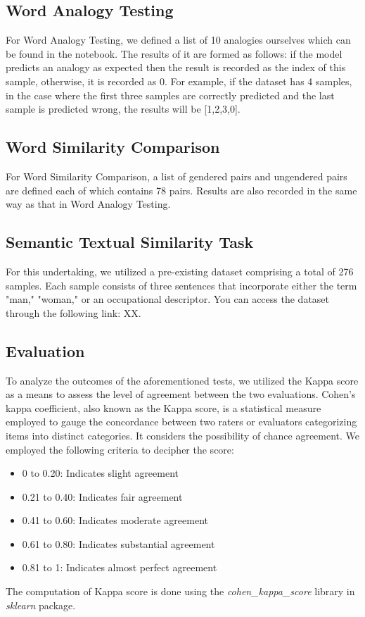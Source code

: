 \documentclass[11pt]{article}
\begin{document}
\subsection{Word Analogy Testing}
For Word Analogy Testing, we defined a list of 10 analogies ourselves which can be found in the notebook. The results of it are formed as follows: if the model predicts an analogy as expected then the result is recorded as the index of this sample, otherwise, it is recorded as 0. For example, if the dataset has 4 samples, in the case where the first three samples are correctly predicted and the last sample is predicted wrong, the results will be [1,2,3,0].\\

\subsection{Word Similarity Comparison}
For Word Similarity Comparison, a list of gendered pairs and ungendered pairs are defined each of which contains 78 pairs. Results are also recorded in the same way as that in Word Analogy Testing. 

\subsection{Semantic Textual Similarity Task}
For this undertaking, we utilized a pre-existing dataset comprising a total of 276 samples. Each sample consists of three sentences that incorporate either the term "man," "woman," or an occupational descriptor. You can access the dataset through the following link: XX.

\subsection{Evaluation}
To analyze the outcomes of the aforementioned tests, we utilized the Kappa score as a means to assess the level of agreement between the two evaluations. Cohen's kappa coefficient, also known as the Kappa score, is a statistical measure employed to gauge the concordance between two raters or evaluators categorizing items into distinct categories. It considers the possibility of chance agreement. We employed the following criteria to decipher the score:
\begin{itemize}
    \item 0 to 0.20: Indicates slight agreement
    \item 0.21 to 0.40: Indicates fair agreement
    \item 0.41 to 0.60: Indicates moderate agreement
    \item 0.61 to 0.80: Indicates substantial agreement
    \item 0.81 to 1: Indicates almost perfect agreement
\end{itemize}
The computation of Kappa score is done using the \textit{cohen\_kappa\_score} library in \textit{sklearn} package.
\end{document}
